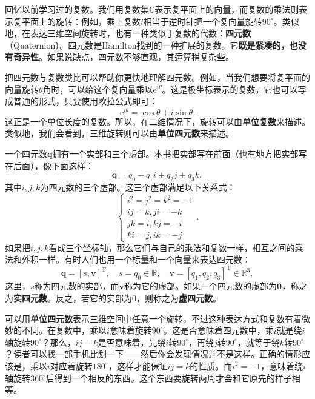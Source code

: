 回忆以前学习过的复数。我们用复数集$\mathbb{C}$表示复平面上的向量，而复数的乘法则表示复平面上的旋转：例如，乘上复数$i$相当于逆时针把一个复向量旋转$90^\circ$。类似地，在表达三维空间旋转时，也有一种类似于复数的代数：\textbf{四元数}（Quaternion）。四元数是Hamilton找到的一种扩展的复数。它\textbf{既是紧凑的，也没有奇异性}。如果说缺点，四元数不够直观，其运算稍复杂些。

把四元数与复数类比可以帮助你更快地理解四元数。例如，当我们想要将复平面的向量旋转$\theta$角时，可以给这个复向量乘以$\mathrm{e}^{i\theta}$。这是极坐标表示的复数，它也可以写成普通的形式，只要使用欧拉公式即可：
\begin{equation}
\mathrm{e}^{i\theta} = \cos \theta + i \sin \theta.
\end{equation}
这正是一个单位长度的复数。所以，在二维情况下，旋转可以由\textbf{单位复数}来描述。类似地，我们会看到，三维旋转则可以由\textbf{单位四元数}来描述。

一个四元数$\bm{q}$拥有一个实部和三个虚部。本书把实部写在前面（也有地方把实部写在后面），像下面这样：
\begin{equation}
 \bm{q} = q_0 + q_1 i + q_2 j + q_3 k,
\end{equation}
其中$i,j,k$为四元数的三个虚部。这三个虚部满足以下关系式：
\begin{equation}
\label{eq:quaternionVirtual}
\left\{ \begin{array}{l}
{i^2} = {j^2} = {k^2} =  - 1\\
ij = k,ji =  - k\\
jk = i,kj =  - i\\
ki = j,ik =  - j
\end{array} \right. .
\end{equation}
如果把$i,j,k$看成三个坐标轴，那么它们与自己的乘法和复数一样，相互之间的乘法和外积一样。有时人们也用一个标量和一个向量来表达四元数：
\[
 \bm{q} = \left[ s, \bm{v} \right]^\mathrm{T}, \quad s=q_0 \in \mathbb{R},\quad \bm{v} = [q_1, q_2, q_3]^\mathrm{T} \in \mathbb{R}^3,
\]
这里，$s$称为四元数的实部，而$\bm{v}$称为它的虚部。如果一个四元数的虚部为$\bm{0}$，称之为\textbf{实四元数}。反之，若它的实部为$0$，则称之为\textbf{虚四元数}。


可以用\textbf{单位四元数}表示三维空间中任意一个旋转，不过这种表达方式和复数有着微妙的不同。在复数中，乘以$i$意味着旋转$90^\circ$。这是否意味着四元数中，乘$i$就是绕$i$轴旋转$90^\circ$？那么，$ij=k$是否意味着，先绕$i$转$90^\circ$，再绕$j$转$90^\circ$，就等于绕$k$转$90^\circ$？读者可以找一部手机比划一下——然后你会发现情况并不是这样。正确的情形应该是，乘以$i$对应着旋转$180^\circ$，这样才能保证$ij=k$的性质。而$i^2=-1$，意味着绕$i$轴旋转$360^\circ$后得到一个相反的东西。这个东西要旋转两周才会和它原先的样子相等。

